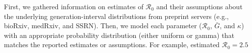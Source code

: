 \documentclass[12pt]{article}
\begin{document}
First, we gathered information on estimates of $\mathcal R_0$ and their
assumptions about the underlying generation-interval distributions from preprint servers (e.g., bioRxiv, medRxiv, and SSRN).
Then, we model each parameter ($\mathcal R_0$, $\bar G$, and $\kappa$) with an appropriate probability distribution (either uniform or gamma) that matches the reported estimates or assumptions.
For example, \cite{imaincov} estimated $\mathcal R_0 = 2.5$



\pagebreak


\end{document}
